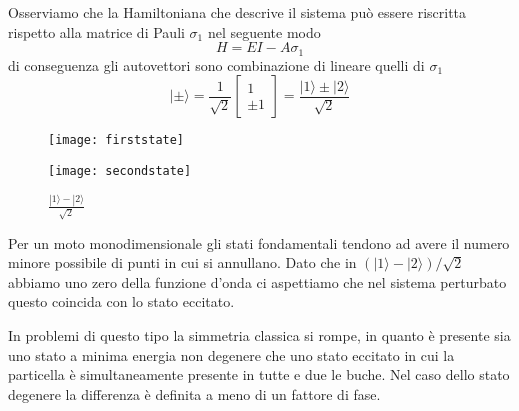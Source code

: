 Osserviamo che la Hamiltoniana che descrive il sistema pu\`o essere riscritta rispetto alla matrice di Pauli $\sigma_1$ nel seguente modo
\begin{equation*}
	H = EI - A \sigma_1
\end{equation*}
di conseguenza gli autovettori sono combinazione di lineare quelli di $\sigma_1$
\begin{equation*}
	|\pm \rangle = \frac{1}{\sqrt{2}}\left [\begin{array}{c}
		1 \\ \pm 1
	\end{array} \right ]  = \frac{|1 \rangle \pm |2\rangle }{\sqrt{2}}
\end{equation*}
\newpage 
\begin{figure}[ht]
    \begin{minipage}[b]{0.45\linewidth}
        \centering
        \texttt{[image: firststate]}
        \caption{$\frac{|1\rangle + |2\rangle }{\sqrt{2}}$}
    \end{minipage}
    \hspace{0.1\linewidth}
    \begin{minipage}[b]{0.45\linewidth}
        \centering
        \texttt{[image: secondstate]}
        \caption{$\frac{|1\rangle - |2\rangle }{\sqrt{2}}$}
    \end{minipage}
\end{figure}
Per un moto monodimensionale gli stati fondamentali tendono ad avere il numero minore possibile di punti in cui si annullano. Dato che in $(|1 \rangle - |2 \rangle)/\sqrt{2}$ abbiamo uno zero della funzione d'onda ci aspettiamo che nel sistema perturbato questo coincida con lo stato eccitato.

In problemi di questo tipo la simmetria classica si rompe, in quanto \`e presente sia uno stato a minima energia non degenere che uno stato eccitato in cui la particella \`e simultaneamente  presente in tutte e due le buche. Nel caso dello stato degenere la differenza \`e definita a meno di un fattore di fase.


